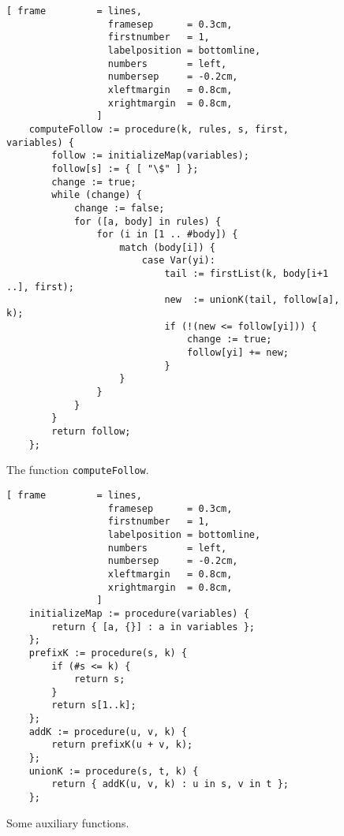 \begin{figure}[!ht]
\centering
\begin{Verbatim}[ frame         = lines, 
                  framesep      = 0.3cm, 
                  firstnumber   = 1,
                  labelposition = bottomline,
                  numbers       = left,
                  numbersep     = -0.2cm,
                  xleftmargin   = 0.8cm,
                  xrightmargin  = 0.8cm,
                ]
    computeFollow := procedure(k, rules, s, first, variables) {
        follow := initializeMap(variables);
        follow[s] := { [ "\$" ] };
        change := true;
        while (change) {
            change := false;    
            for ([a, body] in rules) {
                for (i in [1 .. #body]) {
                    match (body[i]) {
                        case Var(yi):
                            tail := firstList(k, body[i+1 ..], first);
                            new  := unionK(tail, follow[a], k);
                            if (!(new <= follow[yi])) { 
                                change := true; 
                                follow[yi] += new;
                            }
                    }
                }
            }
        }
        return follow;
    };
\end{Verbatim}
\vspace*{-0.3cm}
\caption{The function \texttt{computeFollow}.}
\label{fig:llk.stlx:computeFollow}
\end{figure}

\pagebreak 

\begin{figure}[!ht]
\centering
\begin{Verbatim}[ frame         = lines, 
                  framesep      = 0.3cm, 
                  firstnumber   = 1,
                  labelposition = bottomline,
                  numbers       = left,
                  numbersep     = -0.2cm,
                  xleftmargin   = 0.8cm,
                  xrightmargin  = 0.8cm,
                ]
    initializeMap := procedure(variables) {
        return { [a, {}] : a in variables };
    };
    prefixK := procedure(s, k) {
        if (#s <= k) {
            return s;
        }
        return s[1..k];
    };
    addK := procedure(u, v, k) {
        return prefixK(u + v, k);
    };
    unionK := procedure(s, t, k) {
        return { addK(u, v, k) : u in s, v in t };
    };    
\end{Verbatim}
\vspace*{-0.3cm}
\caption{Some auxiliary functions.}
\label{fig:llk.stlx:auxiliary}
\end{figure}

